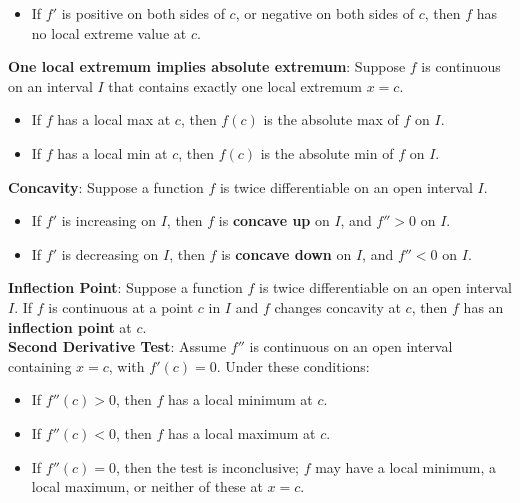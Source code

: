 \documentclass{article}
\begin{document}
\begin{itemize}
\begin{itemize}
        \item If $f'$ is positive on both sides of $c$, or negative on both sides of $c$, then $f$ has no local extreme value at $c$.
    \end{itemize}
    \textbf{One local extremum implies absolute extremum}: Suppose $f$ is continuous on an interval $I$ that contains exactly one local extremum $x = c$.
    \begin{itemize}
        \item If $f$ has a local max at $c$, then $f(c)$ is the absolute max of $f$ on $I$.
        \item If $f$ has a local min at $c$, then $f(c)$ is the absolute min of $f$ on $I$.
    \end{itemize}
    \textbf{Concavity}: Suppose a function $f$ is twice differentiable on an open interval $I$.
    \begin{itemize}
        \item If $f'$ is increasing on $I$, then $f$ is \textbf{concave up} on $I$, and $f'' > 0$ on $I$.
        \item If $f'$ is decreasing on $I$, then $f$ is \textbf{concave down} on $I$, and $f'' < 0$ on $I$.
    \end{itemize}
    \textbf{Inflection Point}: Suppose a function $f$ is twice differentiable on an open interval $I$. If $f$ is continuous at a point $c$ in $I$ and $f$ changes concavity at $c$, then $f$ has an \textbf{inflection point} at $c$. \\
    \textbf{Second Derivative Test}: Assume $f''$ is continuous on an open interval containing $x = c$, with $f'(c) = 0$. Under these conditions:
    \begin{itemize}
        \item If $f''(c) > 0$, then $f$ has a local minimum at $c$.
        \item If $f''(c) < 0$, then $f$ has a local maximum at $c$.
        \item If $f''(c) = 0$, then the test is inconclusive; $f$ may have a local minimum, a local maximum, or neither of these at $x = c$.
    \end{itemize}
\end{itemize}
\end{document}
